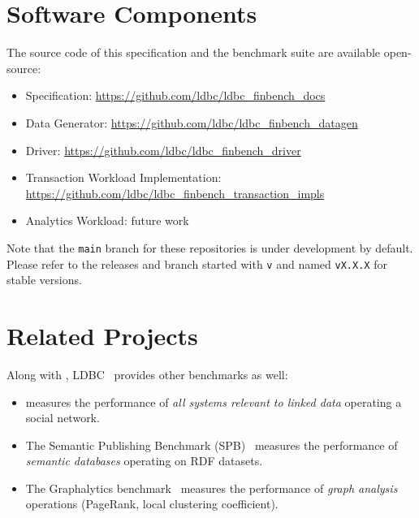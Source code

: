 \section{Software Components}
\label{sec:software-components}

The source code of this specification and the benchmark suite are available
open-source:
\begin{itemize}
      \item \ldbcfinbench Specification: \url{https://github.com/ldbc/ldbc_finbench_docs}
      \item \ldbcfinbench Data Generator: \url{https://github.com/ldbc/ldbc_finbench_datagen}
      \item \ldbcfinbench Driver: \url{https://github.com/ldbc/ldbc_finbench_driver}
      \item Transaction Workload Implementation: \url{https://github.com/ldbc/ldbc_finbench_transaction_impls}
      \item Analytics Workload: future work
\end{itemize}

Note that the \texttt{main} branch for these repositories is under development
by default. Please refer to the releases and branch started with \texttt{v} and
named \texttt{vX.X.X} for stable versions.


\section{Related Projects}

Along with \ldbcfinbench, LDBC~\cite{DBLP:journals/sigmod/AnglesBLF0ENMKT14}
provides other benchmarks as well:

\begin{itemize}
      \item \ldbcsnb measures the performance of \emph{all systems relevant to
                  linked data} operating a social network.
      \item The Semantic Publishing Benchmark
            (SPB)~\cite{DBLP:conf/semweb/SpasicJP16} measures the performance of
            \emph{semantic databases} operating on RDF datasets.
      \item The Graphalytics
            benchmark~\cite{DBLP:journals/pvldb/IosupHNHPMCCSAT16} measures the
            performance of \emph{graph analysis} operations (\eg PageRank, local
            clustering coefficient).
\end{itemize}